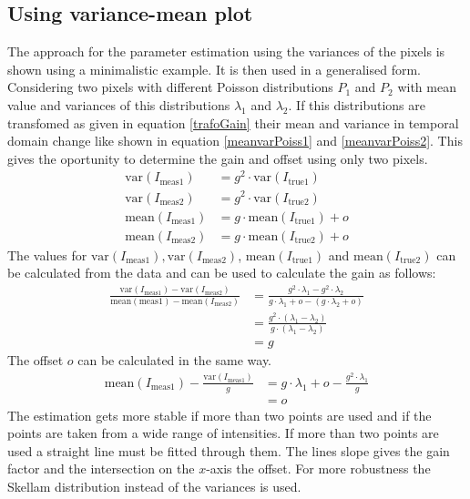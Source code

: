 \subsection{Using variance-mean plot} \label{skellam1}
The approach for the parameter estimation using the variances of the pixels is shown using a minimalistic example. It is then used in a generalised form.\newline
Considering two pixels with different Poisson distributions $P_1$ and $P_2$ with mean value and variances of this distributions $\lambda_1$ and $\lambda_2$. If this distributions are transfomed as given in equation \ref{trafoGain} their mean and variance in temporal domain change like shown in equation \ref{meanvarPoiss1} and \ref{meanvarPoiss2}. This gives the oportunity to determine the gain and offset using only two pixels.
\begin{align}
	\text{var}(I_{\text{meas}1})& = g^2\cdot\text{var}(I_{\text{true}1}) \label{calcvar}\\ 
	\text{var}(I_{\text{meas}2})& = g^2\cdot\text{var}(I_{\text{true}2})\\
	\text{mean}(I_{\text{meas}1})& = g\cdot \text{mean}(I_{\text{true}1}) + o\\
	\text{mean}(I_{\text{meas}2})& = g\cdot \text{mean}(I_{\text{true}2}) + o
\end{align}
The values for $\text{var}(I_{\text{meas}1}), \text{var}(I_{\text{meas}2})$, $\text{mean}(I_{\text{true}1})$ and $\text{mean}(I_{\text{true}2})$ can be calculated from the data and can be used to calculate the gain as follows:
\begin{align}
	\frac{\text{var}(I_{\text{meas}1})-\text{var}(I_{\text{meas}2})}{\text{mean}({\text{meas}1})-\text{mean}(I_{\text{meas}2})}&= \frac{g^2\cdot \lambda_1  - g^2\cdot \lambda_2 }{g\cdot \lambda_1 + o - (g\cdot \lambda_2+o)}\\
	& = \frac{g^2\cdot(\lambda_1-\lambda_2)}{g\cdot (\lambda_1-\lambda_2)}\\
	& = g
\end{align}
The offset $o$ can be calculated in the same way.
\begin{align}
	\text{mean}(I_{\text{meas}1}) - \frac{\text{var}(I_{\text{meas}1})}{g} &= g\cdot \lambda_1 + o - \frac{g^2\cdot\lambda_1}{g}\\
	&= o
\end{align}
The estimation gets more stable if more than two points are used and if the points are taken from a wide range of intensities. If more than two points are used a straight line must be fitted through them. The lines slope gives the gain factor and the intersection on the $x$-axis the offset. For more robustness the Skellam distribution instead of the variances is used. 
